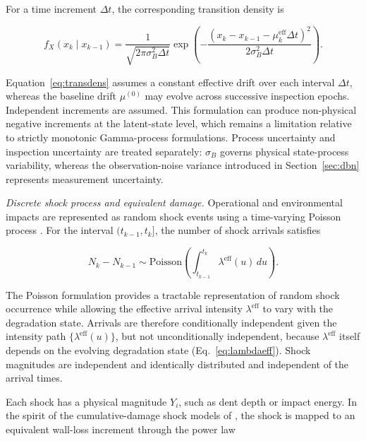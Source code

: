 \documentclass[journal]{IEEEtran}
\begin{document}
For a time increment $\Delta t$, the corresponding transition density
is

\begin{equation}
f_X(x_k \mid x_{k-1}) =
\frac{1}{\sqrt{2\pi\sigma_B^2\Delta t}}
\exp\!\left(
-\frac{
(x_k-x_{k-1}-\mu^{\mathrm{eff}}_{k}\Delta t)^2
}{
2\sigma_B^2\Delta t
}
\right).
\label{eq:transdens}
\end{equation}

Equation~\eqref{eq:transdens} assumes a constant effective drift over
each interval $\Delta t$, whereas the baseline drift
$\mu^{(0)}$ may evolve across successive inspection epochs. Independent
increments are assumed. This formulation can produce non-physical
negative increments at the latent-state level, which remains a
limitation relative to strictly monotonic Gamma-process formulations.
Process uncertainty and inspection uncertainty are treated separately:
$\sigma_B$ governs physical state-process variability, whereas the
observation-noise variance introduced in Section~\ref{sec:dbn}
represents measurement uncertainty.



\textit{Discrete shock process and equivalent damage.}
Operational and environmental impacts are represented as random shock
events using a time-varying Poisson process
\cite{rafiee2017}. For the interval $(t_{k-1},t_k]$, the number of
shock arrivals satisfies

\begin{equation}
N_k-N_{k-1}
\sim
\mathrm{Poisson}\!\left(
\int_{t_{k-1}}^{t_k}
\lambda^{\mathrm{eff}}(u)\,du
\right).
\label{eq:poisson}
\end{equation}

The Poisson formulation provides a tractable representation of random
shock occurrence while allowing the effective arrival intensity
$\lambda^{\mathrm{eff}}$ to vary with the degradation state. Arrivals
are therefore conditionally independent given the intensity path
$\{\lambda^{\mathrm{eff}}(u)\}$, but not unconditionally independent,
because $\lambda^{\mathrm{eff}}$ itself depends on the evolving
degradation state (Eq.~\eqref{eq:lambdaeff}). Shock magnitudes are
independent and identically distributed and independent of the arrival
times.

Each shock has a physical magnitude $Y_i$, such as dent depth or
impact energy. In the spirit of the cumulative-damage shock models of
\cite{rafiee2017}, the shock is mapped to an equivalent wall-loss
increment through the power law
\end{document}
